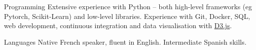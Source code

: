 


\begin{cvskills}

  \cvskill
    {Programming}
    {Extensive experience with Python – both high-level frameworks (eg Pytorch, Scikit-Learn) and low-level libraries.}
  \cvskill
    {}
    {Experience with Git, Docker, SQL, web development, continuous integration and data visualisation with \href{d3js.org}{D3.js}.}



  \cvskill
    {Languages} %
    {Native French speaker, fluent in English. Intermediate Spanish skills.} %

\end{cvskills}
